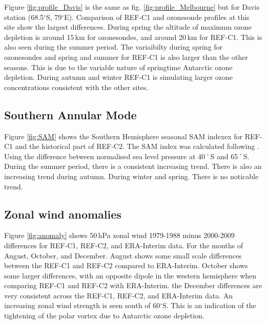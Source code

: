Figure \ref{fig:profile_Davis} is the same as fig. \ref{fig:profile_Melbourne} but for Davis station (68.5$^\circ$S, 79$^\circ$E). Comparison of REF-C1 and ozonesonde profiles at this site show the largest differences. During spring the altitude of maximum ozone depletion is around 15\,km for ozonesondes, and around 20\,km for REF-C1. This is also seen during the summer period. The variaibilty during spring for ozonesondes and spring and summer for REF-C1 is also larger than the other seasons. This is due to the variable nature of springtime Antarctic ozone depletion. During autumn and winter REF-C1 is simulating larger ozone concentrations consistent with the other sites. 

\subsection{Southern Annular Mode}
Figure \ref{fig:SAM} shows the Southern Hemisphere seasonal SAM indexex for REF-C1 and the historical part of REF-C2.  The SAM index was calculated following \cite{DaoyiGong:2007vm}. Using the difference between normalised sea level pressure at 40˚S and 65˚S. During the summer period, there is a consistent increasing trend. There is also an increasing trend during autumn. During winter and spring. There is no noticable trend.

\subsection{Zonal wind anomalies}
Figure \ref{fig:anomaly} shows 50\,hPa zonal wind 1979-1988 minus 2000-2009 differences for REF-C1, REF-C2, and ERA-Interim data. For the months of August, October, and December. August shows some small scale differences between the REF-C1 and REF-C2 compared to ERA-Interim. October shows some larger differences, with an opposite dipole in the western hemisphere when comparing REF-C1 and REF-C2 with ERA-Interim. the December differences are very consistent across the REF-C1, REF-C2, and ERA-Interim data. An increasing zonal wind strength is seen south of 60$^\circ$S. This is an indication of the tightening of the polar vortex due to Antarctic ozone depletion.